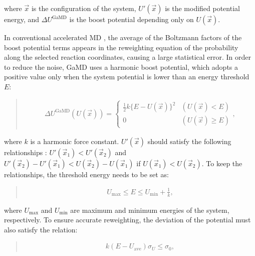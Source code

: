 \documentclass[a4paper,11pt,oneside,english]{sphinxmanual}
\begin{document}
where \(\vec{x}\) is the configuration of the system,
\(U'(\vec{x})\) is the modified potential energy,
and \(\Delta U^{\mathrm{GaMD}}\) is the boost potential
depending only on \(U(\vec{x})\).

In conventional accelerated MD ,
the average of the Boltzmann factors of the boost potential terms appears in the
reweighting equation of the probability along the selected reaction coordinates,
causing a large statistical error.
In order to reduce the noise, GaMD uses a harmonic boost potential, which adopts
a positive value only when the system potential is lower than an energy threshold \(E\):
\begin{quote}

\vspace{-5mm}
\begin{equation*}
\begin{split}\Delta U^{\mathrm{GaMD}}\left(U(\vec{x})\right) =
\begin{cases}
  \frac{1}{2}k\{E-U(\vec{x})\}^2 & (U(\vec{x}) < E) \\
  0 & (U(\vec{x}) \ge E)
\end{cases},\end{split}
\end{equation*}
\vspace{-3mm}
\end{quote}

where \(k\) is a harmonic force constant.
\(U'(\vec{x})\) should satisfy the following relationships :
\(U'(\vec{x}_1) < U'(\vec{x}_2)\) and \(U'(\vec{x}_2) - U'(\vec{x}_1) < U(\vec{x}_2) - U(\vec{x}_1)\)
if \(U(\vec{x}_1) < U(\vec{x}_2)\).
To keep the relationships, the threshold energy needs to be set as:
\begin{quote}

\vspace{-5mm}
\begin{equation*}
\begin{split}U_{\mathrm{max}} \le E \le U_{\mathrm{min}} + \frac{1}{k},\end{split}
\end{equation*}
\vspace{-3mm}
\end{quote}

where \(U_{\mathrm{max}}\) and \(U_{\mathrm{min}}\) are
maximum and minimum energies of the system, respectively.
To ensure accurate reweighting, the deviation of the potential
must also satisfy the relation:
\begin{quote}

\vspace{-5mm}
\begin{equation*}
\begin{split}k(E-U_{\mathrm{ave}}) \sigma_{U} \le \sigma_0,\end{split}
\end{equation*}
\vspace{-3mm}
\end{quote}
\end{document}

